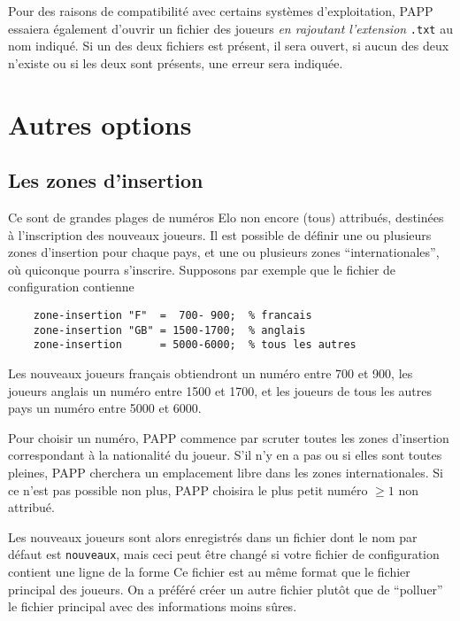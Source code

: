 \documentclass[10pt]{article}
\begin{document}
Pour des raisons de compatibilité avec certains systèmes d'exploitation, PAPP essaiera également d'ouvrir un fichier des joueurs {\em en rajoutant l'extension} \verb|.txt| au nom indiqué. Si un des deux fichiers est présent, il sera ouvert, si aucun des deux n'existe ou si les deux sont présents, une erreur sera indiquée.

\section{Autres options}

\subsection{Les zones d'insertion}

	Ce sont de grandes plages de numéros Elo non encore (tous)
attribués, destinées à l'inscription des nouveaux joueurs.  Il est
possible de définir une ou plusieurs zones d'insertion pour chaque
pays, et une ou plusieurs zones ``internationales'', o\`u quiconque
pourra s'inscrire.
Supposons par exemple que le fichier de configuration contienne
\begin{verbatim}
    zone-insertion "F"  =  700- 900;  % francais
    zone-insertion "GB" = 1500-1700;  % anglais
    zone-insertion      = 5000-6000;  % tous les autres
\end{verbatim}

	Les nouveaux joueurs fran{\c c}ais obtiendront un numéro entre
700 et 900, les joueurs anglais un numéro entre 1500 et 1700, et les
joueurs de tous les autres pays un numéro entre 5000 et 6000.

	Pour choisir un numéro, PAPP commence par scruter toutes les
zones d'insertion correspondant à la nationalité du joueur. S'il n'y
en a pas ou si elles sont toutes pleines, PAPP cherchera un emplacement
libre dans les zones internationales. Si ce n'est pas possible non plus,
PAPP choisira le plus petit numéro $\ge1$ non attribué.

	Les nouveaux joueurs sont alors enregistrés dans un fichier
dont le nom par défaut est \verb|nouveaux|, mais ceci peut être
changé si votre fichier de configuration contient une ligne de la
forme
\medbreak
Ce fichier est au même format que le fichier principal des joueurs. On a
préféré créer un autre fichier plut\^ot que de ``polluer'' le fichier
principal avec des informations moins s\^ures.
\end{document}
